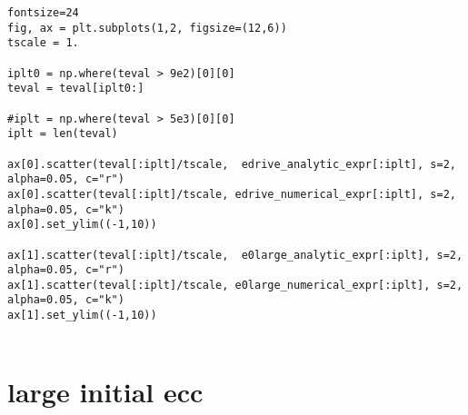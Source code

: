 \documentclass[11pt]{article}
\begin{document}
\begin{verbatim}
fontsize=24
fig, ax = plt.subplots(1,2, figsize=(12,6))
tscale = 1.

iplt0 = np.where(teval > 9e2)[0][0]
teval = teval[iplt0:]

#iplt = np.where(teval > 5e3)[0][0]
iplt = len(teval)

ax[0].scatter(teval[:iplt]/tscale,  edrive_analytic_expr[:iplt], s=2, alpha=0.05, c="r")
ax[0].scatter(teval[:iplt]/tscale, edrive_numerical_expr[:iplt], s=2, alpha=0.05, c="k")
ax[0].set_ylim((-1,10))

ax[1].scatter(teval[:iplt]/tscale,  e0large_analytic_expr[:iplt], s=2, alpha=0.05, c="r")
ax[1].scatter(teval[:iplt]/tscale, e0large_numerical_expr[:iplt], s=2, alpha=0.05, c="k")
ax[1].set_ylim((-1,10))


\end{verbatim}

\section{large initial ecc}
\label{sec:orge365980}
\end{document}
